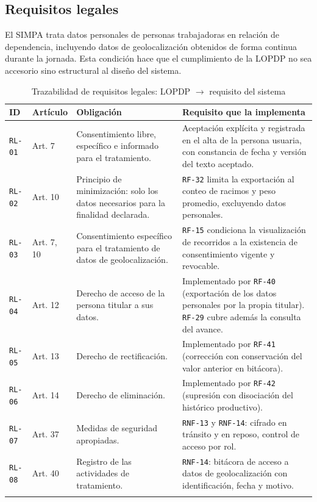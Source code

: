 \documentclass[11pt,a4paper]{article}
\newcommand{\id}[1]{\texttt{\begingroup\hyphenpenalty=10000\relax#1\endgroup}}
\renewcommand{\id}[1]{\texttt{#1}}
\begin{document}
\subsection{Requisitos legales}

El SIMPA trata datos personales de personas trabajadoras en relación de dependencia, incluyendo
datos de geolocalización obtenidos de forma continua durante la jornada. Esta condición hace que el
cumplimiento de la LOPDP \cite{lopdp} no sea accesorio sino estructural al diseño del sistema.

\begin{longtable}{|C{1.5cm}|C{1.8cm}|L{6.0cm}|L{5.4cm}|}
\hline
{}\textbf{ID} & \textbf{Artículo} & \textbf{Obligación} & \textbf{Requisito que la implementa} \\
\hline
\endhead
\id{RL-01} & Art. 7 & Consentimiento libre, específico e informado para el tratamiento. & Aceptación explícita y registrada en el alta de la persona usuaria, con constancia de fecha y versión del texto aceptado. \\ \hline
\id{RL-02} & Art. 10 & Principio de minimización: solo los datos necesarios para la finalidad declarada. & \id{RF-32} limita la exportación al conteo de racimos y peso promedio, excluyendo datos personales. \\ \hline
\id{RL-03} & Art. 7, 10 & Consentimiento específico para el tratamiento de datos de geolocalización. & \id{RF-15} condiciona la visualización de recorridos a la existencia de consentimiento vigente y revocable. \\ \hline
\id{RL-04} & Art. 12 & Derecho de acceso de la persona titular a sus datos. & Implementado por \id{RF-40} (exportación de los datos personales por la propia titular). \id{RF-29} cubre además la consulta del avance. \\ \hline
\id{RL-05} & Art. 13 & Derecho de rectificación. & Implementado por \id{RF-41} (corrección con conservación del valor anterior en bitácora). \\ \hline
\id{RL-06} & Art. 14 & Derecho de eliminación. & Implementado por \id{RF-42} (supresión con disociación del histórico productivo). \\ \hline
\id{RL-07} & Art. 37 & Medidas de seguridad apropiadas. & \id{RNF-13} y \id{RNF-14}: cifrado en tránsito y en reposo, control de acceso por rol. \\ \hline
\id{RL-08} & Art. 40 & Registro de las actividades de tratamiento. & \id{RNF-14}: bitácora de acceso a datos de geolocalización con identificación, fecha y motivo. \\ \hline
\caption{Trazabilidad de requisitos legales: LOPDP $\rightarrow$ requisito del sistema}
\end{longtable}
\end{document}
